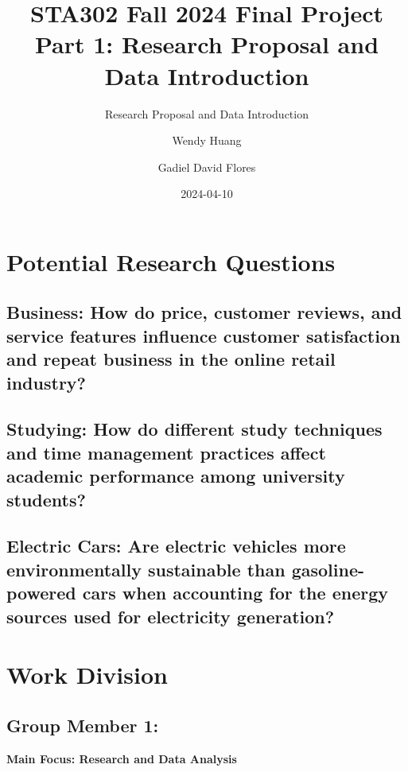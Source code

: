 \documentclass[
  letterpaper,
  DIV=11,
  numbers=noendperiod]{scrartcl}
\title{STA302 Fall 2024 Final Project Part 1: Research Proposal and Data
Introduction}
\subtitle{Research Proposal and Data Introduction}
\author{Wendy Huang \and Gadiel David Flores}
\date{2024-04-10}
\begin{document}
\maketitle


\section{Potential Research
Questions}\label{potential-research-questions}

\subsection{Business: How do price, customer reviews, and service
features influence customer satisfaction and repeat business in the
online retail
industry?}\label{business-how-do-price-customer-reviews-and-service-features-influence-customer-satisfaction-and-repeat-business-in-the-online-retail-industry}

\subsection{Studying: How do different study techniques and time
management practices affect academic performance among university
students?}\label{studying-how-do-different-study-techniques-and-time-management-practices-affect-academic-performance-among-university-students}

\subsection{Electric Cars: Are electric vehicles more environmentally
sustainable than gasoline-powered cars when accounting for the energy
sources used for electricity
generation?}\label{electric-cars-are-electric-vehicles-more-environmentally-sustainable-than-gasoline-powered-cars-when-accounting-for-the-energy-sources-used-for-electricity-generation}

\section{Work Division}\label{work-division}

\subsection{Group Member 1:}\label{group-member-1}

\textbf{Main Focus: Research and Data Analysis}
\end{document}
